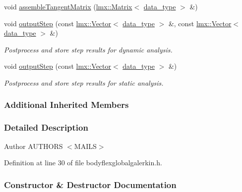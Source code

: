 \begin{DoxyCompactItemize}
\item 
void \hyperlink{classmknix_1_1_flex_global_galerkin_ab5ddc03826dcf8dea98fd53093b2dfe7}{assemble\+Tangent\+Matrix} (\hyperlink{classlmx_1_1_matrix}{lmx\+::\+Matrix}$<$ \hyperlink{namespacemknix_a16be4b246fbf2cceb141e3a179111020}{data\+\_\+type} $>$ \&)
\item 
void \hyperlink{classmknix_1_1_flex_global_galerkin_a031a130b73e3fe0fc862393f94d235cb}{output\+Step} (const \hyperlink{classlmx_1_1_vector}{lmx\+::\+Vector}$<$ \hyperlink{namespacemknix_a16be4b246fbf2cceb141e3a179111020}{data\+\_\+type} $>$ \&, const \hyperlink{classlmx_1_1_vector}{lmx\+::\+Vector}$<$ \hyperlink{namespacemknix_a16be4b246fbf2cceb141e3a179111020}{data\+\_\+type} $>$ \&)
\begin{DoxyCompactList}\small\item\em Postprocess and store step results for dynamic analysis. \end{DoxyCompactList}\item 
void \hyperlink{classmknix_1_1_flex_global_galerkin_a1882efa0a8f8c8832f6116b8f7874d2a}{output\+Step} (const \hyperlink{classlmx_1_1_vector}{lmx\+::\+Vector}$<$ \hyperlink{namespacemknix_a16be4b246fbf2cceb141e3a179111020}{data\+\_\+type} $>$ \&)
\begin{DoxyCompactList}\small\item\em Postprocess and store step results for static analysis. \end{DoxyCompactList}\end{DoxyCompactItemize}
\subsubsection*{Additional Inherited Members}


\subsubsection{Detailed Description}
\begin{DoxyAuthor}{Author}
A\+U\+T\+H\+O\+R\+S $<$\+M\+A\+I\+L\+S$>$ 
\end{DoxyAuthor}


Definition at line 30 of file bodyflexglobalgalerkin.\+h.



\subsubsection{Constructor \& Destructor Documentation}
\hypertarget{classmknix_1_1_flex_global_galerkin_a29073fc9c4530cafc194be20b5a713be}{}
